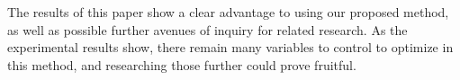 \documentclass[paper]{ieice}
\begin{document}
The results of this paper show a clear advantage to using our proposed method, as well as possible further avenues of inquiry for related research. As the experimental results show, there remain many variables to control to optimize in this method, and researching those further could prove fruitful.


\end{document}

